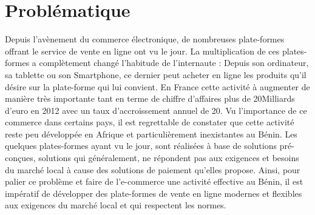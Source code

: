\section{Problématique}

Depuis l’avènement du commerce électronique, de nombreuses plate-formes offrant le service de vente en ligne
ont vu le jour. La multiplication de ces plates-formes a complètement changé
l’habitude de l’internaute : Depuis son ordinateur, sa tablette ou son
Smartphone, ce dernier peut acheter en ligne les produits qu’il désire sur la plate-forme qui lui convient.
En France cette activité à augmenter de manière très importante tant en terme de chiffre d'affaires plus de 20Milliards d'euro en 2012 avec un taux d'accroissement annuel de 20\textdiscount. Vu l'importance de ce commerce dans certains pays, il est regrettable de constater que cette activité reste peu développée en Afrique et particulièrement inexistantes au Bénin. Les quelques plates-formes ayant vu le jour, sont réalisées à base de solutions pré-conçues, solutions qui généralement, ne répondent pas aux exigences et besoins du marché local à cause des solutions de paiement qu'elles propose. Ainsi, pour palier ce problème et faire de l’e-commerce une activité effective au Bénin, il est impératif de développer des plate-formes de vente en ligne modernes et flexibles aux exigences du marché local et qui respectent les normes.